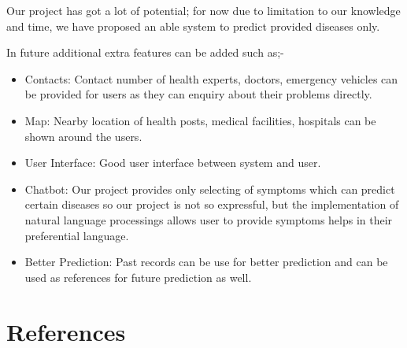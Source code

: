 {Our project has got a lot of potential; for now due to limitation to our knowledge and time, we have proposed an able system to predict provided diseases only.

In future additional extra features can be added such as;- 
\begin{itemize}
    \item Contacts: Contact number of health experts, doctors, emergency vehicles can be provided for users as they can enquiry about their problems directly.
    \item Map: Nearby location of health posts, medical facilities, hospitals can be shown around the users.
    \item User Interface: Good user interface between system and user.
    \item Chatbot: Our project provides only selecting of symptoms which can predict certain diseases so our project is not so expressful, but the implementation of natural language processings allows user to provide symptoms helps in their preferential language. 
    \item Better Prediction: Past records can be use for better prediction and can be used as references for future prediction as well.
        
\end{itemize}


\chapter*{References}

}
